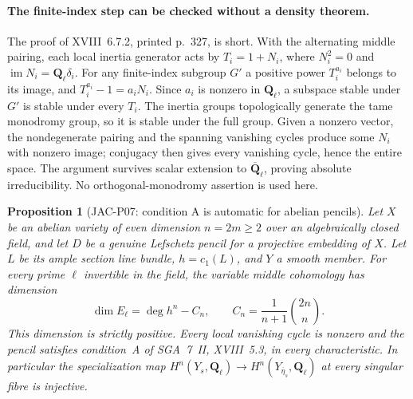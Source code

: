 \documentclass[11pt,a4paper]{article}
\newtheorem{proposition}[theorem]{Proposition}
\begin{document}
\paragraph{The finite-index step can be checked without a density theorem.}
The proof of XVIII~6.7.2, printed p.~327, is short.  With the
alternating middle pairing, each local inertia generator acts by
$T_i=1+N_i$, where $N_i^2=0$ and
$\operatorname{im}N_i=\mathbf Q_\ell\delta_i$.
For any finite-index subgroup $G'$ a positive power $T_i^{a_i}$
belongs to its image, and
$T_i^{a_i}-1=a_iN_i$.  Since $a_i$ is nonzero in $\mathbf Q_\ell$,
a subspace stable under $G'$ is stable under every $T_i$.
The inertia groups topologically generate the tame monodromy group,
so it is stable under the full group.  Given a nonzero vector, the
nondegenerate pairing and the spanning vanishing cycles produce
some $N_i$ with nonzero image; conjugacy then gives every vanishing
cycle, hence the entire space.  The argument survives scalar
extension to $\overline{\mathbf Q}_\ell$, proving absolute
irreducibility.  No orthogonal-monodromy assertion is used here.

\begin{proposition}[JAC-P07: condition A is automatic for abelian pencils]
\label{jac:P07}
Let $X$ be an abelian variety of even dimension $n=2m\ge2$ over an
algebraically closed field, and let $D$ be a genuine Lefschetz pencil
for a projective embedding of $X$.  Let $L$ be its ample section
line bundle, $h=c_1(L)$, and $Y$ a smooth member.  For every prime
$\ell$ invertible in the field, the variable middle cohomology has
dimension
\[
 \dim E_\ell=\deg h^n-C_n,
 \qquad C_n=\frac1{n+1}\binom{2n}{n}.
                                                        \tag{JAC.P07.1}
\]
This dimension is strictly positive.  Every local vanishing cycle
is nonzero and the pencil satisfies condition~A of SGA~7~II,
XVIII~5.3, in every characteristic.  In particular the
specialization map $H^n(Y_s,\mathbf Q_\ell)\to
H^n(Y_{\overline\eta_s},\mathbf Q_\ell)$ at every singular fibre
is injective.
\end{proposition}
\end{document}
